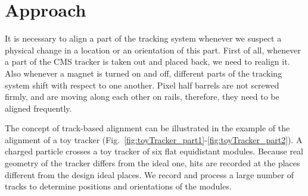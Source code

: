 \section{Approach}
\label{sec:alignmentAlg}


It is necessary to align a part of the tracking system whenever we suspect a physical change in a location or an orientation of this part. First of all, whenever a part of the CMS tracker is taken out and placed back, we need to realign it. Also whenever a magnet is turned on and off, different parts of the tracking system shift with respect to one another. Pixel half barrels are not screwed firmly, and are moving along each other on rails, therefore, they need to be aligned frequently. %

The concept of track-based alignment can be illustrated in the example of the alignment of a toy tracker (Fig.~\ref{fig:toyTracker_part1}-\ref{fig:toyTracker_part2}). A charged particle crosses a toy tracker of six flat equidistant modules. Because real geometry of the tracker differs from the ideal one, hits are recorded at the places different from the design ideal places. We record and process a large number of tracks to determine positions and orientations of the modules.

